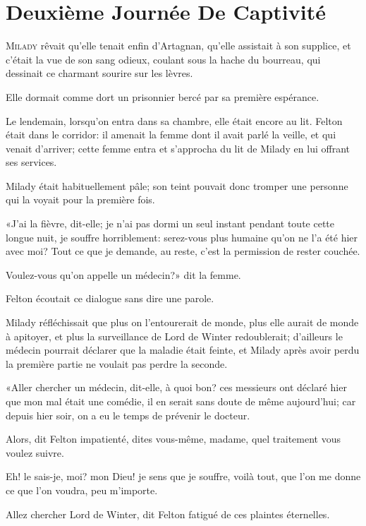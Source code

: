 
\chapter{Deuxième Journée De Captivité}

\lettrine{M}{ilady} rêvait qu'elle tenait enfin d'Artagnan, qu'elle assistait à son supplice, et c'était la vue de son sang odieux, coulant sous la hache du bourreau, qui dessinait ce charmant sourire sur les lèvres. 

\zz
Elle dormait comme dort un prisonnier bercé par sa première espérance. 

Le lendemain, lorsqu'on entra dans sa chambre, elle était encore au lit. Felton était dans le corridor: il amenait la femme dont il avait parlé la veille, et qui venait d'arriver; cette femme entra et s'approcha du lit de Milady en lui offrant ses services. 

Milady était habituellement pâle; son teint pouvait donc tromper une personne qui la voyait pour la première fois. 

«J'ai la fièvre, dit-elle; je n'ai pas dormi un seul instant pendant toute cette longue nuit, je souffre horriblement: serez-vous plus humaine qu'on ne l'a été hier avec moi? Tout ce que je demande, au reste, c'est la permission de rester couchée. 

\speak  Voulez-vous qu'on appelle un médecin?» dit la femme. 

Felton écoutait ce dialogue sans dire une parole. 

Milady réfléchissait que plus on l'entourerait de monde, plus elle aurait de monde à apitoyer, et plus la surveillance de Lord de Winter redoublerait; d'ailleurs le médecin pourrait déclarer que la maladie était feinte, et Milady après avoir perdu la première partie ne voulait pas perdre la seconde. 

«Aller chercher un médecin, dit-elle, à quoi bon? ces messieurs ont déclaré hier que mon mal était une comédie, il en serait sans doute de même aujourd'hui; car depuis hier soir, on a eu le temps de prévenir le docteur. 

\speak  Alors, dit Felton impatienté, dites vous-même, madame, quel traitement vous voulez suivre. 

\speak  Eh! le sais-je, moi? mon Dieu! je sens que je souffre, voilà tout, que l'on me donne ce que l'on voudra, peu m'importe. 

\speak  Allez chercher Lord de Winter, dit Felton fatigué de ces plaintes éternelles. 


